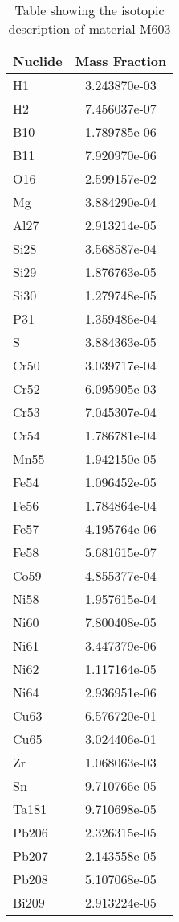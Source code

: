 \begin{centering}
\begin{table}[ht!]
\begin{tabular}{l | c}
\hline
Nuclide & Mass Fraction\\
\hline
H1 & 3.243870e-03\\
H2 & 7.456037e-07\\
B10 & 1.789785e-06\\
B11 & 7.920970e-06\\
O16 & 2.599157e-02\\
Mg & 3.884290e-04\\
Al27 & 2.913214e-05\\
Si28 & 3.568587e-04\\
Si29 & 1.876763e-05\\
Si30 & 1.279748e-05\\
P31 & 1.359486e-04\\
S & 3.884363e-05\\
Cr50 & 3.039717e-04\\
Cr52 & 6.095905e-03\\
Cr53 & 7.045307e-04\\
Cr54 & 1.786781e-04\\
Mn55 & 1.942150e-05\\
Fe54 & 1.096452e-05\\
Fe56 & 1.784864e-04\\
Fe57 & 4.195764e-06\\
Fe58 & 5.681615e-07\\
Co59 & 4.855377e-04\\
Ni58 & 1.957615e-04\\
Ni60 & 7.800408e-05\\
Ni61 & 3.447379e-06\\
Ni62 & 1.117164e-05\\
Ni64 & 2.936951e-06\\
Cu63 & 6.576720e-01\\
Cu65 & 3.024406e-01\\
Zr & 1.068063e-03\\
Sn & 9.710766e-05\\
Ta181 & 9.710698e-05\\
Pb206 & 2.326315e-05\\
Pb207 & 2.143558e-05\\
Pb208 & 5.107068e-05\\
Bi209 & 2.913224e-05
\end{tabular}
\caption{Table showing the isotopic description of material M603}
\label{table:material_M603}
\end{table}\clearpage


\end{centering}
